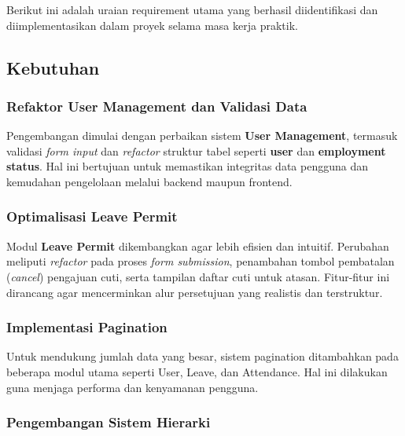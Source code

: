 Berikut ini adalah uraian requirement utama yang berhasil diidentifikasi dan diimplementasikan dalam proyek selama masa kerja praktik.

\subsection{Kebutuhan}
\subsubsection{Refaktor User Management dan Validasi Data}

Pengembangan dimulai dengan perbaikan sistem \textbf{User Management}, termasuk validasi \textit{form input} dan \textit{refactor} struktur tabel seperti \textbf{user} dan \textbf{employment status}. Hal ini bertujuan untuk memastikan integritas data pengguna dan kemudahan pengelolaan melalui backend maupun frontend.
\subsubsection{Optimalisasi Leave Permit}

Modul \textbf{Leave Permit} dikembangkan agar lebih efisien dan intuitif. Perubahan meliputi \textit{refactor} pada proses \textit{form submission}, penambahan tombol pembatalan (\textit{cancel}) pengajuan cuti, serta tampilan daftar cuti untuk atasan. Fitur-fitur ini dirancang agar mencerminkan alur persetujuan yang realistis dan terstruktur.
\subsubsection{Implementasi Pagination}

Untuk mendukung jumlah data yang besar, sistem pagination ditambahkan pada beberapa modul utama seperti User, Leave, dan Attendance. Hal ini dilakukan guna menjaga performa dan kenyamanan pengguna.
\subsubsection{Pengembangan Sistem Hierarki}

